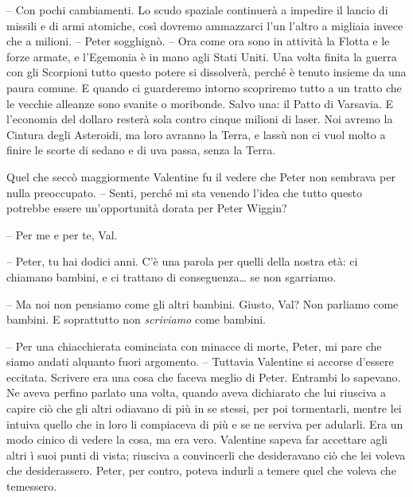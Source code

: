{-- Con pochi cambiamenti. Lo scudo spaziale continuerà a impedire il
	lancio di missili e di armi atomiche, così dovremo ammazzarci l'un
	l'altro a migliaia invece che a milioni. -- Peter sogghignò. -- Ora come
	ora sono in attività la Flotta e le forze armate, e l'Egemonia è in mano
	agli Stati Uniti. Una volta finita la guerra con gli Scorpioni tutto
	questo potere si dissolverà, perché è tenuto insieme da una paura
	comune. E quando ci guarderemo intorno scopriremo tutto a un tratto che
	le vecchie alleanze sono svanite o moribonde. Salvo una: il Patto di
	Varsavia. E l'economia del dollaro resterà sola contro cinque milioni di
	laser. Noi avremo la Cintura degli Asteroidi, ma loro avranno la Terra,
	e lassù non ci vuol molto a finire le scorte di sedano e di uva passa,
	senza la Terra.}

{Quel che seccò maggiormente Valentine fu il vedere che Peter non
	sembrava per nulla preoccupato. -- Senti, perché mi sta venendo l'idea
	che tutto questo potrebbe essere un'opportunità dorata per Peter
	Wiggin?}

{-- Per me e per te, Val.}

{-- Peter, tu hai dodici anni. C'è una parola per quelli della nostra
	età: ci chiamano bambini, e ci trattano di conseguenza\ldots{} se non
	sgarriamo.}

{-- Ma noi non pensiamo come gli altri bambini. Giusto, Val? Non
	parliamo come bambini. E soprattutto non \emph{scriviamo} come bambini.}

{-- Per una chiacchierata cominciata con minacce di morte, Peter, mi
	pare che siamo andati alquanto fuori argomento. -- Tuttavia Valentine si
	accorse d'essere eccitata. Scrivere era una cosa che faceva meglio di
	Peter. Entrambi lo sapevano. Ne aveva perfino parlato una volta, quando
	aveva dichiarato che lui riusciva a capire ciò che gli altri odiavano di
	più in se stessi, per poi tormentarli, mentre lei intuiva quello che in
	loro li compiaceva di più e se ne serviva per adularli. Era un modo
	cinico di vedere la cosa, ma era vero. Valentine sapeva far accettare
	agli altri ì suoi punti di vista; riusciva a convincerli che
	desideravano ciò che lei voleva che desiderassero. Peter, per contro,
	poteva indurli a temere quel che voleva che temessero.}

